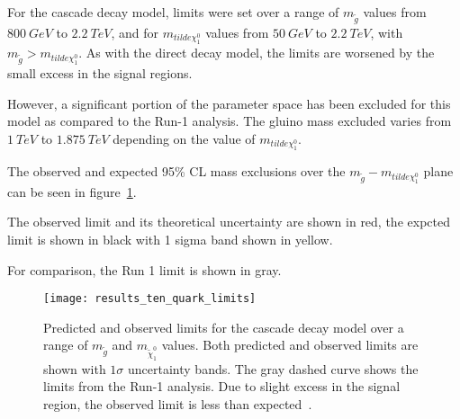 For the cascade decay model, limits were set over a range of $m_{\tilde{g}}$ values from $800~GeV$ to $2.2~TeV$,
and for $m_{tilde{\chi}_1^0}$ values from $50~GeV$ to $2.2~TeV$, with $m_{\tilde{g}} > m_{tilde{\chi}_1^0}$.
As with the direct decay model, the limits are worsened by the small excess in the signal regions.

However, a significant portion of the parameter space has been excluded for this model as compared to the Run-1 analysis.
The gluino mass excluded varies from $1~TeV$ to $1.875~TeV$ depending on the value of $m_{tilde{\chi}_1^0}$.

The observed and expected 95\% CL mass exclusions over the  $m_{\tilde{g}} - m_{tilde{\chi}_1^0}$ plane can be seen in figure~\ref{fig:results_ten_quark_limits}.

The observed limit and its theoretical uncertainty are shown in red, the expcted limit is shown in black with 1 sigma band
shown in yellow.

For comparison, the Run 1 limit is shown in gray.

\begin{figure}[!ht]
    \centering
    \texttt{[image: results\_ten\_quark\_limits]}
    \caption{Predicted and observed limits for the cascade decay model over a range of $m_{\tilde{g}}$ and $m_{\tilde{\chi}_1^0}$ values.
    Both predicted and observed limits are shown with $1\sigma$ uncertainty bands.
    The gray dashed curve shows the limits from the Run-1 analysis.
    Due to slight excess in the signal region, the observed limit is less than expected~\cite{paper-plb}.}
\label{fig:results_ten_quark_limits}
\end{figure}

